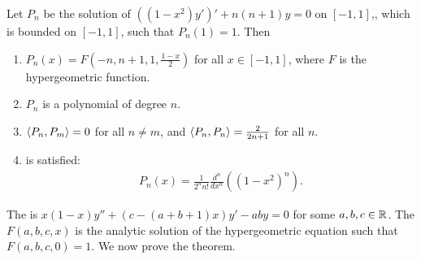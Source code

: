 \begin{theorem}
    Let $P_{n}$ be the solution of $((1-x^{2})y')' + n(n+1) y = 0$ on $[-1,1]$,, which is bounded on $[-1,1]$, such that $P_{n}(1) = 1$. Then
    \begin{enumerate}[label=\arabic*.]
        \item $P_{n}(x) = F(-n,n+1,1,\frac{1-x}{2})$ for all $x \in [-1,1]$, where $F$ is the hypergeometric function.
        \item $P_{n}$ is a polynomial of degree $n$.
        \item $\langle P_{n},P_{m}\rangle = 0$ for all $n \neq m$, and $\langle P_{n},P_{n}\rangle = \frac{2}{2n+1}$ for all $n$.
        \item {} is satisfied:
        \begin{align}
            P_{n}(x) = \frac{1}{2^{n} n!} \frac{d^{n}}{dx^{n}} ((1-x^{2})^{n}).
        \end{align}
    \end{enumerate}
\end{theorem}

The  is $x(1-x) y'' + (c-(a+b+1)x) y' - ab y = 0$ for some $a,b,c \in \mathbb{R}$. The  $F(a,b,c,x)$ is the analytic solution of the hypergeometric equation such that $F(a,b,c,0) = 1$. We now prove the theorem.

